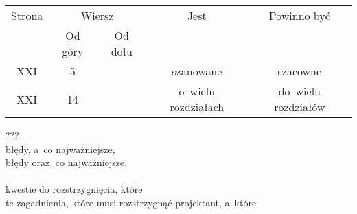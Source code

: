 \documentclass[a4paper,11pt]{article}
\numberwithin{equation}{section}
\begin{document}








































\newpage



\begin{center}

  \begin{tabular}{|c|c|c|c|c|}
    \hline
    Strona & \multicolumn{2}{c|}{Wiersz} & Jest
                              & Powinno być \\ \cline{2-3}
    & Od góry & Od dołu & & \\
    \hline
    XXI & \hphantom{0}5 & & szanowane & szacowne \\
    XXI & 14 & & o~wielu rozdziałach & do~wielu rozdziałów \\
    \hline
  \end{tabular}

\end{center}

\VerSpaceTwo


\noindent
{} ??? \\
\Jest błędy, a~co najważniejsze, \\
\PowinnoByc błędy oraz, co najważniejsze, \\
 \\
\Jest kwestie do rozstrzygnięcia, które \\
\PowinnoByc te zagadnienia, które musi rozstrzygnąć projektant, a~które \\
\end{document}
